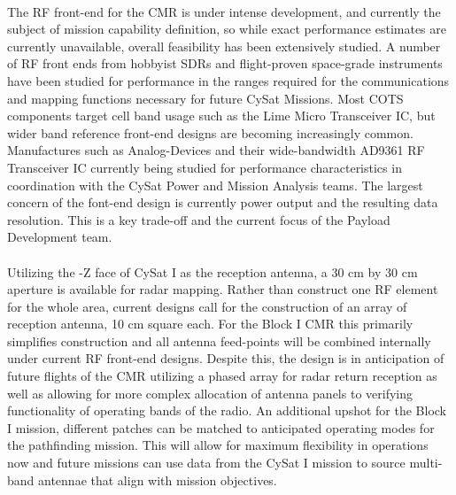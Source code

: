\documentclass[nocover]            %
{CSLI}                       %
\begin{document}
\\The RF front-end for the CMR is under intense development, and currently the subject of mission capability definition, so while exact performance estimates are currently unavailable, overall feasibility has been extensively studied. A number of RF front ends from hobbyist SDRs and flight-proven space-grade instruments have been studied for performance in the ranges required for the communications and mapping functions necessary for future CySat Missions. Most COTS components target cell band usage such as the Lime Micro Transceiver IC, but wider band reference front-end designs are becoming increasingly common. Manufactures such as Analog-Devices and their wide-bandwidth AD9361 RF Transceiver IC currently being studied for performance characteristics in coordination with the CySat Power and Mission Analysis teams. The largest concern of the font-end design is currently power output and the resulting data resolution. This is a key trade-off and the current focus of the Payload Development team.\\
\\Utilizing the -Z face of CySat I as the reception antenna, a 30 cm by 30 cm aperture is available for radar mapping. Rather than construct one RF element for the whole area, current designs call for the construction of an array of reception antenna, 10 cm square each. For the Block I CMR this primarily simplifies construction and all antenna feed-points will be combined internally under current RF front-end designs. Despite this, the design is in anticipation of future flights of the CMR utilizing a phased array for radar return reception as well as allowing for more complex allocation of antenna panels to verifying functionality of operating bands of the radio. An additional upshot for the Block I mission, different patches can be matched to anticipated operating modes for the pathfinding mission. This will allow for maximum flexibility in operations now and future missions can use data from the CySat I mission to source multi-band antennae that align with mission objectives.
\end{document}
